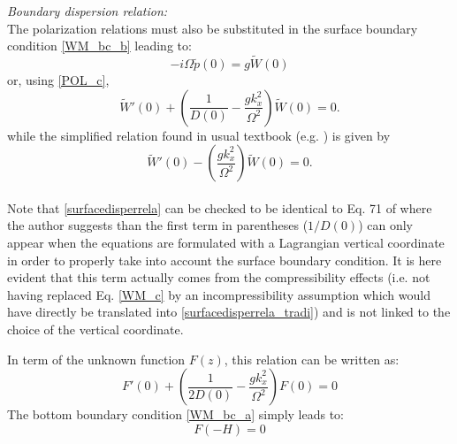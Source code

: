 \documentclass[a4paper,11pt]{article}
\begin{document}
\textit{Boundary dispersion relation:}\\
The polarization relations must also be substituted in the surface boundary condition \ref{WM_bc_b} leading to:
\begin{equation}
  \displaystyle
  -i\Omega \widetilde{p}(0)=g \widetilde{W}(0)
\end{equation}
or, using \ref{POL_c},
\begin{equation}
  \displaystyle
  \widetilde{W}'(0)+\left(
  \frac{1}{D(0)}-\frac{gk_x^2}{\Omega^2}
  \right)\widetilde{W}(0)=0.
  \label{surfacedisperrela}
\end{equation}
while the simplified relation found in usual textbook (e.g. \cite{gill_1982}) is given by
\begin{equation}
\displaystyle
\widetilde{W}'(0)-\left(
\frac{gk_x^2}{\Omega^2}
\right)\widetilde{W}(0)=0.
\label{surfacedisperrela_tradi}
\end{equation}\\
Note that \ref{surfacedisperrela} can be checked to be identical to Eq. 71 of \cite{dukowicz_2013} where the author suggests than the first term in parentheses ($1/D(0)$) can only appear when the equations are formulated with a Lagrangian vertical coordinate in order to properly take into account the surface boundary condition.
It is here evident that this term actually comes from the compressibility effects (i.e. not having replaced Eq. \ref{WM_c} by an incompressibility assumption which would have directly be translated into \ref{surfacedisperrela_tradi}) and is not linked to the choice of the vertical coordinate.

In term of the unknown function $F(z)$, this relation can be written as:
\begin{equation}
  \displaystyle
  F'(0)+\left(
  \frac{1}{2D(0)}-\frac{gk_x^2}{\Omega^2}
  \right)F(0)=0
  \label{eqFbc}
\end{equation}
The bottom boundary condition \ref{WM_bc_a} simply leads to:
\begin{equation}
  \displaystyle
  F(-H)=0
  \label{eqFbc2}
\end{equation}
\end{document}
